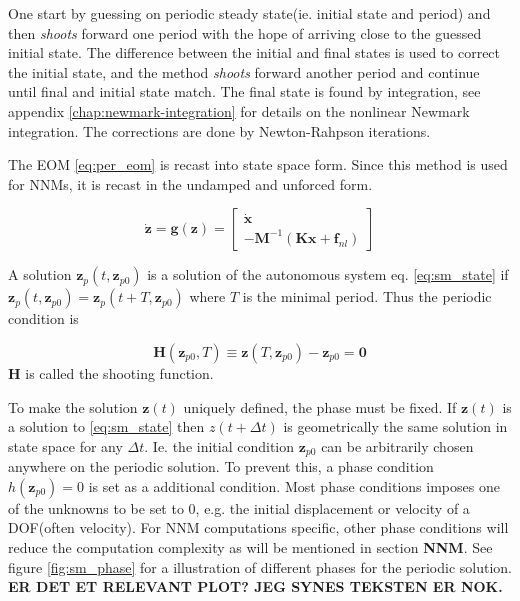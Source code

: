 One start by guessing on periodic steady state(ie. initial state
and period) and then \textit{shoots} forward one period with the hope of
arriving close to the guessed initial state. The difference between the initial
and final states is used to correct the initial state, and the method
\textit{shoots} forward another period and continue until final and initial
state match.
The final state is found by integration, see appendix
\ref{chap:newmark-integration} for details on the nonlinear Newmark integration.
The corrections are done by Newton-Rahpson iterations.

The EOM \eqref{eq:per_eom} is recast into state space form. Since this method is
used for NNMs, it is recast in the undamped and unforced form.

\begin{equation}
  \label{eq:sm_state}
  \dot{\bm z} = \bm g (\bm z) =
  \begin{bmatrix}
    \dot{\bm x} \\
    -\bm M^{-1}(\bm K \bm x  + \bm f_{nl})
  \end{bmatrix}
\end{equation}


A solution $\bm z_p(t, \bm z_{p0})$ is a solution of the autonomous system eq.
\eqref{eq:sm_state} if $\bm z_p(t, \bm z_{p0}) = \bm z_p(t+T, \bm z_{p0})$ where
$T$ is the minimal period. Thus the periodic condition is

\begin{equation}
  \label{eq:sm_per_cond}
  \bm H(\bm z_{p0},T) \equiv \bm z(T, \bm z_{p0}) - \bm z_{p0} = \bm 0
\end{equation}
$\bm H$ is called the shooting function.


To make the solution $\bm z(t)$ uniquely defined, the phase must be fixed. If
$\bm z(t)$ is a solution to \eqref{eq:sm_state} then $z(t + \Delta t)$ is
geometrically the same solution in state space for any $\Delta t$. Ie. the
initial condition $\bm z_{p0}$ can be arbitrarily chosen anywhere on the
periodic solution. To prevent this, a phase condition $h(\bm z_{p0})=0$ is set
as a additional condition. Most phase conditions imposes one of the unknowns to
be set to 0, e.g. the initial displacement or velocity of a DOF(often velocity).
For NNM computations specific, other phase conditions will reduce the
computation complexity as will be mentioned in section \textbf{NNM}. See figure
\ref{fig:sm_phase} for a illustration of different phases for the periodic
solution. \textbf{ER DET ET RELEVANT PLOT? JEG SYNES TEKSTEN ER NOK.}

